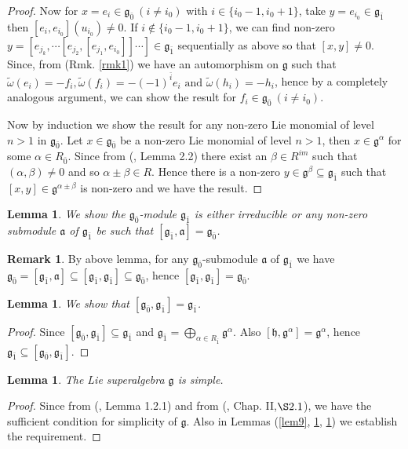 \documentclass[11pt]{amsart}
\theoremstyle{plain}
\newtheorem{lemma}[thm]{Lemma}
\theoremstyle{definition}
\newtheorem{rmk}[thm]{Remark}
\numberwithin{equation}{section}
\newcommand{\al}{\alpha}
\newcommand{\be}{\beta}
\newcommand{\om}{\omega}
\newcommand{\g}{\mathfrak{g}}
\newcommand{\h}{\mathfrak{h}}
\begin{document}
\begin{proof}
		 Now for $x=e_i\in\g_{\bar{0}}~(i\neq i_0)$ with $i\in\{i_0-1,i_0+1\}$, take $y=e_{i_0}\in\g_{\bar{1}}$ then $[e_i,e_{i_0}](u_{i_0})\neq0$. If $i\notin\{i_0-1,i_0+1\}$, we can find non-zero $y=[e_{j_{k}},\cdots[e_{j_2},[e_{j_1},e_{i_0}]]\cdots]\in\g_{\bar{1}}$ sequentially as above so that $[x,y]\neq0$. Since, from (Rmk. \ref{rmk1}) we have an automorphism on $\g$ such that $\widetilde{\om}(e_i)=-f_i,\widetilde{\om}(f_i)=-(-1)^{\bar{i}}e_i\text{ and }\widetilde{\om}(h_i)=-h_i$, hence by a completely analogous argument, we can show the result for $f_i\in\g_{\bar{0}}~(i\neq i_0)$.
		 
		 Now by induction we show the result for any non-zero Lie monomial of level $n>1$ in $\g_{\bar{0}}$. Let $x\in\g_{\bar{0}}$ be a non-zero Lie monomial of level $n>1$, then $x\in \g^{\al}$ for some $\al\in R_{\bar{0}}$. Since from (\cite{gorelik2017generalized}, Lemma 2.2) there exist an $\be\in R^{im}$ such that $(\al,\be)\neq 0$  and so $\al\pm\be\in R$. Hence there is a non-zero $y\in\g^{\be}\subseteq\g_{\bar{1}}$ such that $[x,y]\in\g^{\al\pm\be}$ is non-zero and we have the result.
	\end{proof}
	\begin{lemma}\label{lem10}
		We show the $\g_{\bar{0}}$-module $\g_{\bar{1}}$ is either irreducible or any non-zero submodule $\mathfrak{a}$ of $\g_{\bar{1}}$ be such that $[\g_{\bar{1}},\mathfrak{a}]=\g_{\bar{0}}$.
	\end{lemma}
	\begin{rmk}
		By above lemma, for any $\g_{\bar{0}}$-submodule $\mathfrak{a}$ of $\g_{\bar{1}}$ we have $\g_{\bar{0}}=[\g_{\bar{1}},\mathfrak{a}]\subseteq[\g_{\bar{1}},\g_{\bar{1}}]\subseteq\g_{\bar{0}}$, hence $[\g_{\bar{1}},\g_{\bar{1}}]=\g_{\bar{0}}$.
	\end{rmk}
	\begin{lemma}\label{lem11}
		We show that $[\g_{\bar{0}},\g_{\bar{1}}]=\g_{\bar{1}}$.
	\end{lemma}
\begin{proof}
	Since $[\g_{\bar{0}},\g_{\bar{1}}]\subseteq\g_{\bar{1}}$ and $\g_{\bar{1}}=\bigoplus\limits_{\al\in R_{\bar{1}}}\g^{\al}$. Also $[\h,\g^{\al}]=\g^{\al}$, hence $\g_{\bar{1}}\subseteq[\g_{\bar{0}},\g_{\bar{1}}]$.
\end{proof}
\begin{lemma}
	The Lie superalgebra $\g$ is simple.
\end{lemma}
\begin{proof}
	Since from (\cite{musson2012lie}, Lemma 1.2.1) and from (\cite{scheunert2006theory}, Chap. II,$\S2.1$), we have the sufficient condition for simplicity of $\g$. Also in Lemmas (\ref{lem9}, \ref{lem10}, \ref{lem11}) we establish the requirement.
\end{proof}
\end{document}
